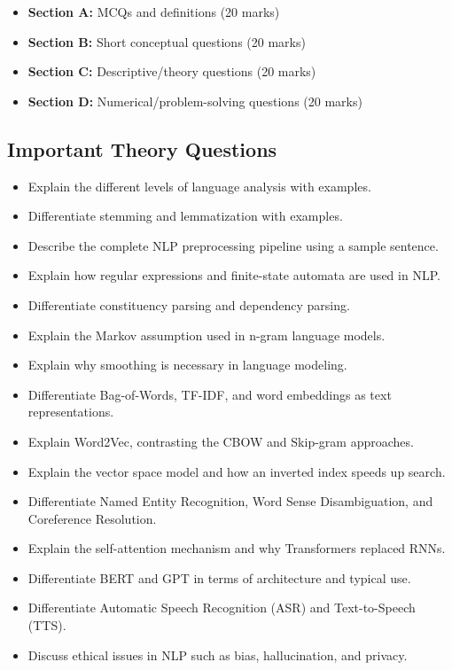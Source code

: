 \documentclass[11pt,a4paper]{article}
\begin{document}
\begin{conceptbox}
\begin{itemize}[leftmargin=*]
  \item \textbf{Section A:} MCQs and definitions (20 marks)
  \item \textbf{Section B:} Short conceptual questions (20 marks)
  \item \textbf{Section C:} Descriptive/theory questions (20 marks)
  \item \textbf{Section D:} Numerical/problem-solving questions (20 marks)
\end{itemize}
\end{conceptbox}

\subsection{Important Theory Questions}
\begin{itemize}[leftmargin=*]
  \item Explain the different levels of language analysis with examples.
  \item Differentiate stemming and lemmatization with examples.
  \item Describe the complete NLP preprocessing pipeline using a sample sentence.
  \item Explain how regular expressions and finite-state automata are used in NLP.
  \item Differentiate constituency parsing and dependency parsing.
  \item Explain the Markov assumption used in n-gram language models.
  \item Explain why smoothing is necessary in language modeling.
  \item Differentiate Bag-of-Words, TF-IDF, and word embeddings as text representations.
  \item Explain Word2Vec, contrasting the CBOW and Skip-gram approaches.
  \item Explain the vector space model and how an inverted index speeds up search.
  \item Differentiate Named Entity Recognition, Word Sense Disambiguation, and Coreference Resolution.
  \item Explain the self-attention mechanism and why Transformers replaced RNNs.
  \item Differentiate BERT and GPT in terms of architecture and typical use.
  \item Differentiate Automatic Speech Recognition (ASR) and Text-to-Speech (TTS).
  \item Discuss ethical issues in NLP such as bias, hallucination, and privacy.
\end{itemize}
\end{document}
